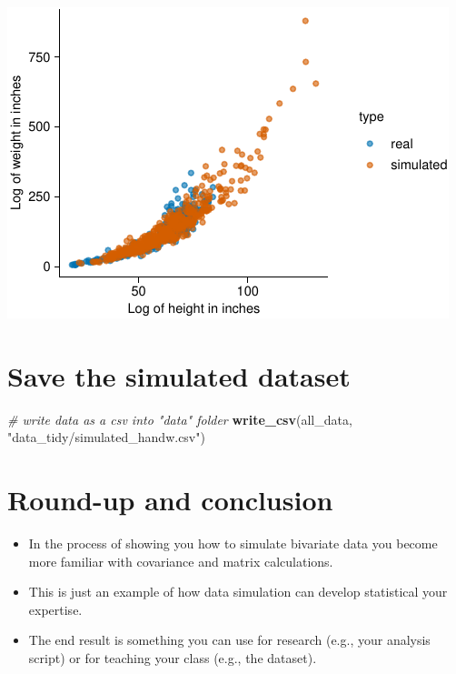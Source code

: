 \documentclass[
]{article}
\newenvironment{Shaded}{\begin{snugshade}}{\end{snugshade}}
\newcommand{\CommentTok}[1]{\textcolor[rgb]{0.56,0.35,0.01}{\textit{#1}}}
\newcommand{\FunctionTok}[1]{\textcolor[rgb]{0.13,0.29,0.53}{\textbf{#1}}}
\newcommand{\NormalTok}[1]{#1}
\newcommand{\StringTok}[1]{\textcolor[rgb]{0.31,0.60,0.02}{#1}}
\providecommand{\tightlist}{%
  \setlength{\itemsep}{0pt}\setlength{\parskip}{0pt}}
\begin{document}
\includegraphics{L6_Correlation_and_regresion_simulation_pdf_files/figure-latex/tidyplot sim data 2-1.pdf}

\hypertarget{save-the-simulated-dataset}{%
\section{Save the simulated dataset}\label{save-the-simulated-dataset}}

\begin{Shaded}
\begin{Highlighting}[]
\CommentTok{\# write data as a csv into "data" folder}
\FunctionTok{write\_csv}\NormalTok{(all\_data, }\StringTok{"data\_tidy/simulated\_handw.csv"}\NormalTok{)}
\end{Highlighting}
\end{Shaded}

\hypertarget{round-up-and-conclusion}{%
\section{Round-up and conclusion}\label{round-up-and-conclusion}}

\begin{itemize}
\tightlist
\item
  In the process of showing you how to simulate bivariate data you
  become more familiar with covariance and matrix calculations.
\item
  This is just an example of how data simulation can develop statistical
  your expertise.
\item
  The end result is something you can use for research (e.g., your
  analysis script) or for teaching your class (e.g., the dataset).
\end{itemize}
\end{document}
